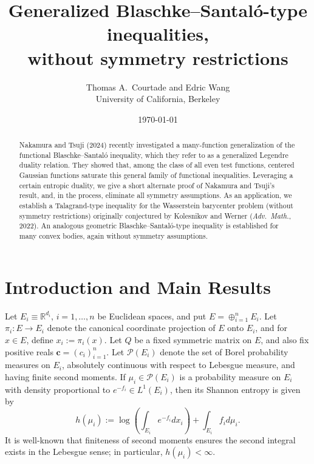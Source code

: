 \documentclass[10pt]{article}
\title{Generalized  Blaschke--Santal\'o-type inequalities, \\
without symmetry restrictions}
\author{Thomas A.~Courtade and Edric Wang \\University of California, Berkeley  }
\date{\today}
\begin{document}
\maketitle

\begin{abstract}
Nakamura and Tsuji (2024) recently investigated a many-function generalization of the functional Blaschke--Santal\'o inequality, which they refer to as a generalized Legendre duality relation.  They showed that, among the class of all even test functions, centered Gaussian functions saturate this general family of functional inequalities.  Leveraging a certain entropic duality, we give a short alternate proof of Nakamura and Tsuji's result, and, in the process, eliminate all symmetry assumptions.  As an application, we establish  a Talagrand-type inequality for the Wasserstein barycenter problem (without symmetry restrictions) originally  conjectured by Kolesnikov and Werner (\textit{Adv.~Math.}, 2022). An analogous geometric Blaschke--Santal\'o-type inequality is established for many convex bodies, again without symmetry assumptions.
\end{abstract}

 

\section{Introduction and Main Results}



Let $E_i \equiv \mathbb{R}^{d_i}$, $i=1, \dots, n$ be Euclidean spaces, and put $E = \oplus_{i=1}^n E_i$.  Let $\pi_i : E \to E_i$ denote the canonical coordinate projection of $E$ onto $E_i$, and for $x\in E$, define $x_i:=\pi_i(x)$. Let $Q$ be a fixed symmetric matrix on $E$, and also fix positive reals $\mathbf{c} = (c_i)_{i=1}^n$. Let $\mathcal{P}(E_i)$ denote the set of Borel probability measures on $E_i$, absolutely continuous with respect to Lebesgue measure, and having finite second moments.  If $\mu_i \in \mathcal{P}(E_i)$ is a probability measure on $E_i$ with density proportional to $e^{-f_i}\in L^1(E_i)$, then its Shannon entropy is given by
$$
h(\mu_i):= \log \left( \int_{E_i} e^{-f_i} dx_i\right)  + \int_{E_i}  f_i d\mu_i. 
$$
It is well-known that finiteness of second moments ensures the second integral exists in the Lebesgue sense; in particular,    $h(\mu_i)<\infty$.
 
\end{document}

